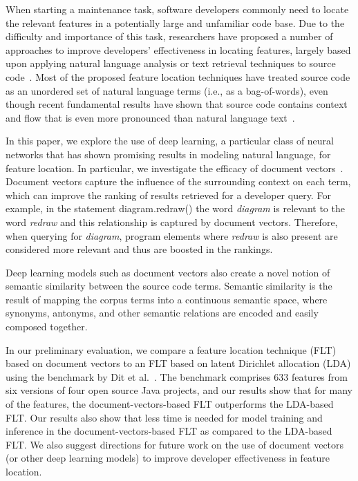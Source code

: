 
% 
%
When starting a maintenance task, software developers commonly need to
locate the relevant features in a potentially large and unfamiliar
code base. Due to the difficulty and importance of this task,
researchers have proposed a number of approaches to improve
developers' effectiveness in locating features, largely based upon
applying natural language analysis or text retrieval techniques to source
code~\cite{dit_feature_2013}. Most of the proposed feature location
techniques have treated source code as an unordered set of natural
language terms (i.e., as a bag-of-words), even though recent fundamental
results have shown that source code contains context and flow that is
even more pronounced than natural language
text~\cite{hindle_naturalness_2012}.


%
%
In this paper, we explore the use of deep learning, a particular class of neural networks that has shown promising
results in modeling natural language, for feature location. In
particular, we investigate the efficacy of document
vectors~\cite{le_distributed_2014}. Document vectors capture the
influence of the surrounding context on each term, which can improve the ranking
of results retrieved for a developer query. For example, in the
statement {\sf diagram.redraw()} the word {\em diagram} is relevant to the word
{\em redraw} and this relationship is captured by document vectors. Therefore, when querying for {\em diagram}, program elements
where {\em redraw} is also present are considered more relevant and thus are boosted in the rankings.

Deep learning models such as document vectors also create a novel notion
of semantic similarity between the source code terms. Semantic
similarity is the result of mapping the corpus terms into a continuous
semantic space, where synonyms, antonyms, and other semantic relations
are encoded and easily composed together.


%
%

In our preliminary evaluation, we compare a feature location technique (FLT) based on document vectors to an FLT based on latent Dirichlet allocation (LDA) using the benchmark by Dit et al.~\cite{Dit-etal_2013}.
The benchmark comprises 633 features from six versions of four open source Java projects, and our results show that for many of the features, the document-vectors-based FLT outperforms the LDA-based FLT.
Our results also show that less time is needed for model training and inference in the document-vectors-based FLT as compared to the LDA-based FLT.
We also suggest directions for future work on the use
of document vectors (or other deep learning models) to improve developer effectiveness in feature location.



